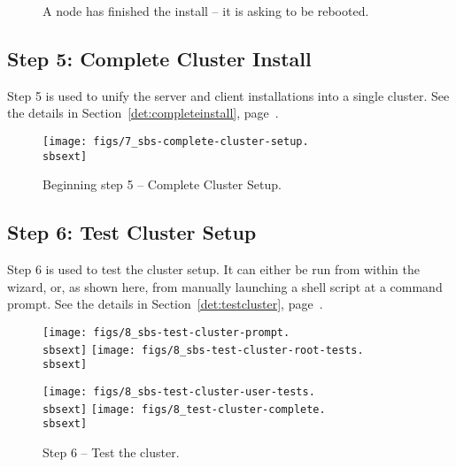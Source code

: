 \begin{figure}[h!]
  \begin{center}
    \centerline{
      }
    \caption{A node has finished the install -- it is asking to be
      rebooted.}
    \label{fig:sbs-install-finish}
  \end{center}
\end{figure}



\clearpage
\subsection{Step 5: Complete Cluster Install} 

Step 5 is used to unify the server and client installations into a
single cluster.  See the details in Section~\ref{det:completeinstall},
page~\pageref{det:completeinstall}.

\begin{figure}[h!]
   \begin{center}
     \centerline{\texttt{[image: figs/7\_sbs-complete-cluster-setup.\\sbsext]}}
     \caption{Beginning step 5 -- Complete Cluster Setup.}
     \label{fig:sbs-install-wizard-s5}
   \end{center}
 \end{figure}



\subsection{Step 6: Test Cluster Setup}

Step 6 is used to test the cluster setup.  It can either be run from
within the wizard, or, as shown here, from manually launching a shell
script at a  command prompt.  See the details in
Section~\ref{det:testcluster}, page~\pageref{det:testcluster}.

\begin{figure}[h!]
  \begin{center}
    \centerline{
      \texttt{[image: figs/8\_sbs-test-cluster-prompt.\\sbsext]}
      \hspace{\imghskip}
      \texttt{[image: figs/8\_sbs-test-cluster-root-tests.\\sbsext]}
      }
    \vspace{\imgvskip}
    \centerline{
      \texttt{[image: figs/8\_sbs-test-cluster-user-tests.\\sbsext]}
      \hspace{\imghskip}
      \texttt{[image: figs/8\_test-cluster-complete.\\sbsext]}
      }
    \caption{Step 6 -- Test the cluster.}
    \label{fig:sbs-setup-test}
  \end{center}
\end{figure}



